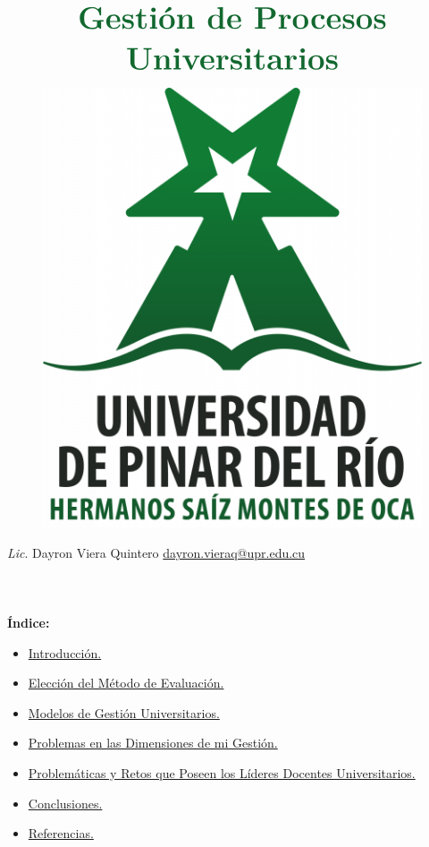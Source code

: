 \documentclass{article}
\begin{document}
$$
\begin{array}{c}
	\text{\color{uprgreen}\bf\Huge Gestión de Procesos}\\ \\
	\text{\color{uprgreen}\bf\Huge Universitarios}
\end{array}
$$

\begin{figure}[h!]
	\centering
	\includegraphics[scale=0.2]{Identidad-a-color-884x1024.png}
\end{figure}

{\large {\it Lic}. Dayron Viera Quintero \hfill \href{mailto:dayron.vieraq@upr.edu.cu}{dayron.vieraq@upr.edu.cu}}\\ \\ \\ \\

{\color{uprgreen}\bf\huge Índice:}
\begin{itemize}
	\item \hyperref[sec:Intro]{\large Introducción.}
	\item \hyperref[sec:EME]{\large Elección del Método de Evaluación.}
	\item \hyperref[sec:MGU]{\large Modelos de Gestión Universitarios.}
	\item \hyperref[sec:PDG]{\large Problemas en las Dimensiones de mi Gestión.}
	\item \hyperref[sec:PRPLDU]{\large Problemáticas y Retos que Poseen los Líderes Docentes Universitarios.}
	\item \hyperref[sec:CON]{\large Conclusiones.}
	\item \hyperref[sec:REF]{\large Referencias.}
\end{itemize}
\end{document}
